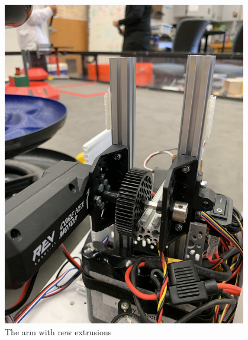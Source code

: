 \begin{figure}[htp]
\centering
\includegraphics[width=0.95\textwidth, angle=0]{Meetings/November/11-05-21/11-5-21_Hardware_Figure 1 - Nathan Forrer.JPG}
\caption{The arm with new extrusions}
\label{fig:pic1}
\end{figure}


